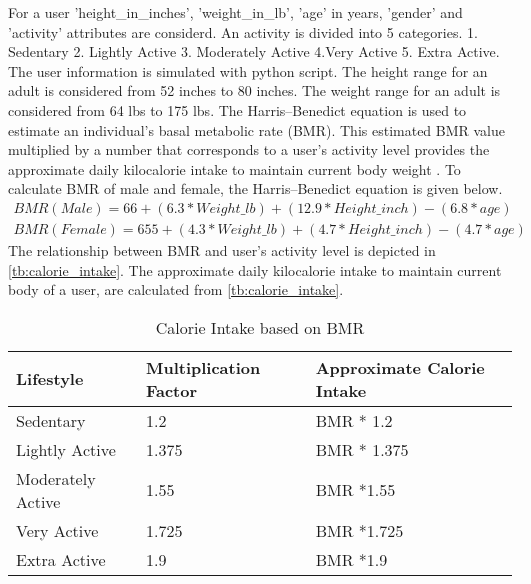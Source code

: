 For a user 'height\_in\_inches', 'weight\_in\_lb', 'age' in years, 'gender' and 'activity' attributes are considerd. An activity is divided  into 5 categories. 1. Sedentary 2. Lightly Active 3. Moderately Active 4.Very Active 5. Extra Active. The user information is simulated with python script. The height range for an adult is considered from 52 inches to 80 inches. The weight range for an adult is considered from 64 lbs to 175 lbs. The Harris–Benedict equation is used to estimate an individual's basal metabolic rate (BMR). This estimated BMR value multiplied by a number that corresponds to a user's activity level provides the approximate daily kilocalorie intake to maintain current body weight \cite{}. To calculate BMR of male and female, the Harris–Benedict equation is given below.
\begin{align}
BMR (Male) = 66 + (6.3 * Weight\_lb) + (12.9 * Height\_inch) - (6.8 * age) \\
BMR (Female) = 655 + (4.3 * Weight\_lb) + (4.7 * Height\_inch) - (4.7 * age)
\end{align}
The relationship between BMR and user's activity level is depicted in \autoref{tb:calorie_intake}.  The approximate daily kilocalorie intake to maintain current body of a user, are calculated from \autoref{tb:calorie_intake}. 
\begin{table}[]
\begin{tabular}{|l|l|l|}
\hline
\rowcolor[HTML]{C0C0C0} 
{\color[HTML]{333333} \textbf{Lifestyle}} & {\color[HTML]{333333} \textbf{Multiplication Factor}} & {\color[HTML]{333333} \textbf{Approximate Calorie Intake}} \\ \hline
Sedentary                                 & 1.2                                                   & BMR * 1.2                                                  \\ \hline
Lightly Active                           & 1.375                                                 & BMR * 1.375                                                \\ \hline
Moderately Active                        & 1.55                                                  & BMR *1.55                                                  \\ \hline
Very Active                              & 1.725                                                 & BMR *1.725                                                 \\ \hline
Extra Active                         & 1.9                                                   & BMR *1.9                                                   \\ \hline
\end{tabular}
\caption{Calorie Intake based on BMR}
\label{tb:calorie_intake}
\end{table}



